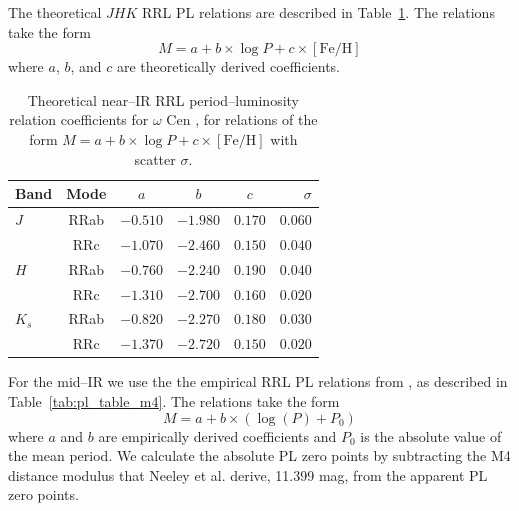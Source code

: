 \documentclass[a4paper,fleqn,usenatbib]{mnras}
\begin{document}
The theoretical $JHK$ RRL PL relations are described in Table~\ref{tab:pl_table_theo}. The relations take the form
\begin{equation}M = a + b\times\log P + c\times[\text{Fe/H}]\end{equation}
where $a$, $b$, and $c$ are theoretically derived coefficients.
\begin{table}
\centering
\caption{Theoretical near--IR RRL period--luminosity relation coefficients for $\omega$ Cen \citep{2015ApJ...808...50M}, for relations of the form $M = a + b \times \log P + c \times [\text{Fe/H}]$ with scatter $\sigma$.}
\label{tab:pl_table_theo}
\begin{tabular}{l||c|c|c|c|r} 
\hline \hline
Band & Mode & $a$   & $b$   & $c$   & $\sigma$ \\
\hline
$J$ & RRab & $-0.510$ & $-1.980$ & $0.170$ & $0.060$ \\
       & RRc & $-1.070$ & $-2.460$ & $0.150$ & $0.040$ \\
$H$ & RRab & $-0.760$ & $-2.240$ & $0.190$ & $0.040$\\
       & RRc & $-1.310$ & $-2.700$ & $0.160$ & $0.020$\\
$K_s$ & RRab & $-0.820$ & $-2.270$ & $0.180$ & $0.030$\\
           & RRc & $-1.370$ & $-2.720$ & $0.150$ & $0.020$ \\       
            \hline
\end{tabular}
\end{table}


For the mid--IR we use the the empirical RRL PL relations from \citet{2015arXiv150507858N}, as described in Table~\ref{tab:pl_table_m4}. The relations take the form
\begin{equation}M = a + b \times (\log (P) + P_0) \end{equation}
where $a$ and $b$ are empirically derived coefficients and $P_0$ is the absolute value of the mean period. We calculate the absolute PL zero points by subtracting the M4 distance modulus that Neeley et al. derive, 11.399 mag, from the apparent PL zero points.
\end{document}

